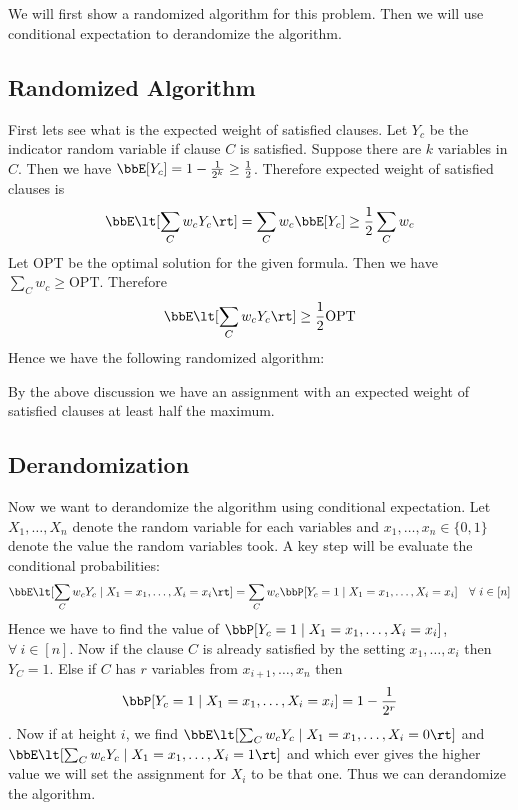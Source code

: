 \section{}
\begin{algoprob}
\end{algoprob}

We will first show a randomized algorithm for this problem. Then we will use conditional expectation to derandomize the algorithm.
\subsection{Randomized Algorithm}
First lets see what is the expected weight of satisfied clauses. Let $Y_c$ be the indicator random variable if clause $C$ is satisfied. Suppose there are $k$ variables in $C$. Then we have $\bbE[Y_c]=1-\frac1{2^k}\geq \frac12$. Therefore expected weight of satisfied clauses is $$\bbE\lt[\sum_{C}w_cY_c\rt]=\sum_Cw_c\bbE[Y_c]\geq \frac12\sum_Cw_c$$Let OPT be the optimal  solution for the given formula. Then we have $\sum\limits_Cw_c\geq \text{OPT}$.  Therefore $$\bbE\lt[\sum_{C}w_cY_c\rt]\geq \frac12\text{OPT}$$Hence we have the following randomized algorithm:

\begin{algorithm}
\DontPrintSemicolon
{}
\caption{}
\end{algorithm}

By the above discussion we have an assignment with an expected weight of satisfied clauses at least half the maximum.
\subsection{Derandomization}
Now we want to derandomize  the algorithm using conditional expectation. Let $X_1,\dots, X_n$ denote the random variable for each variables and $x_1,\dots, x_n\in \{0,1\}$ denote the value the random variables took. A key step will be evaluate the conditional probabilities: $$\bbE\lt[\sum_Cw_cY_c\mid X_1=x_1,\dots, X_i=x_i\rt]=\sum_Cw_c\bbP[Y_c=1\mid X_1=x_1,\dots, X_i=x_i]\quad \forall\ i\in[n]$$Hence we have to find the value of $\bbP[Y_c=1\mid X_1=x_1,\dots, X_i=x_i]$, $\forall\ i\in[n]$. Now if the clause $C$ is already satisfied by the setting $x_1,\dots, x_i$ then $Y_C=1$. Else if $C$ has $r$ variables from $x_{i+1},\dots, x_n$ then $$\bbP[Y_c=1\mid X_1=x_1,\dots, X_i=x_i]=1-\frac1{2^r}$$. Now if at height $i$, we find $\bbE\lt[\sum_Cw_cY_c\mid X_1=x_1,\dots, X_i=0\rt]$ and $\bbE\lt[\sum_Cw_cY_c\mid X_1=x_1,\dots, X_i=1\rt]$ and which ever gives the higher value we will set the assignment for $X_i$ to be that one. Thus we can derandomize the algorithm.
